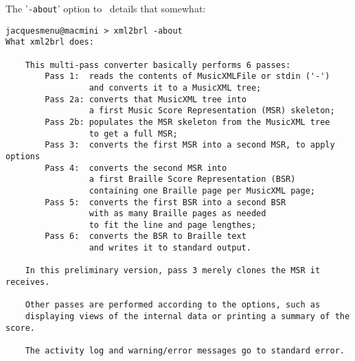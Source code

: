 The '{\tt -about}' option to \xmlToBrl\ details that somewhat:
\begin{lstlisting}[language=MusicXML]
jacquesmenu@macmini > xml2brl -about
What xml2brl does:

    This multi-pass converter basically performs 6 passes:
        Pass 1:  reads the contents of MusicXMLFile or stdin ('-')
                 and converts it to a MusicXML tree;
        Pass 2a: converts that MusicXML tree into
                 a first Music Score Representation (MSR) skeleton;
        Pass 2b: populates the MSR skeleton from the MusicXML tree
                 to get a full MSR;
        Pass 3:  converts the first MSR into a second MSR, to apply options
        Pass 4:  converts the second MSR into
                 a first Braille Score Representation (BSR)
                 containing one Braille page per MusicXML page;
        Pass 5:  converts the first BSR into a second BSR
                 with as many Braille pages as needed
                 to fit the line and page lengthes;
        Pass 6:  converts the BSR to Braille text
                 and writes it to standard output.

    In this preliminary version, pass 3 merely clones the MSR it receives.

    Other passes are performed according to the options, such as
    displaying views of the internal data or printing a summary of the score.

    The activity log and warning/error messages go to standard error.
\end{lstlisting}
